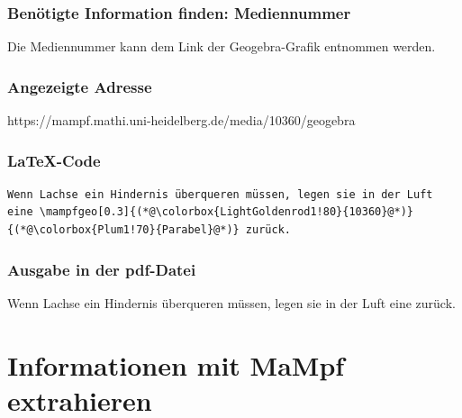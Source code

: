 \documentclass[parskip=off,index=totocnumbered]{scrartcl}
\begin{document}
\subsubsection*{Benötigte Information finden: Mediennummer}
Die Mediennummer kann dem Link der Geogebra-Grafik entnommen werden.

\subsubsection*{Angezeigte Adresse}
https://mampf.mathi.uni-heidelberg.de/media/\colorbox{LightGoldenrod1!80}{10360}/geogebra

\subsubsection*{\LaTeX-Code}
\vspace{-0.2cm}
   \begin{lstlisting}[breaklines=true]   
Wenn Lachse ein Hindernis überqueren müssen, legen sie in der Luft eine \mampfgeo[0.3]{(*@\colorbox{LightGoldenrod1!80}{10360}@*)}{(*@\colorbox{Plum1!70}{Parabel}@*)} zurück. 
   \end{lstlisting}
\vspace{0.2cm}

\subsubsection*{Ausgabe in der pdf-Datei}
Wenn Lachse ein Hindernis überqueren müssen, legen sie in der Luft eine  zurück.
   
   
\section{Informationen mit MaMpf extrahieren} \label{sec:extract}
\end{document}
